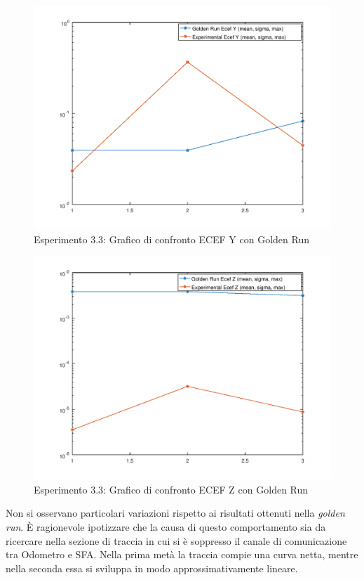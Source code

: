 \begin{figure}[h]
	\centering
	\includegraphics[width=0.7\linewidth]{img/exp13ecefY}
	\caption{Esperimento 3.3: Grafico di confronto ECEF Y con Golden Run}
\end{figure}
\begin{figure}[h]
	\centering
	\includegraphics[width=0.7\linewidth]{img/exp13ecefZ}
	\caption{Esperimento 3.3: Grafico di confronto ECEF Z con Golden Run}
\end{figure}
\FloatBarrier
Non si osservano particolari variazioni rispetto ai risultati ottenuti nella \emph{golden run}. \`E ragionevole ipotizzare che la causa di questo comportamento sia da ricercare nella sezione di traccia in cui si \`e soppresso il canale di comunicazione tra Odometro e SFA. Nella prima met\`a la traccia compie una curva netta, mentre nella seconda essa si sviluppa in modo approssimativamente lineare.
\FloatBarrier
